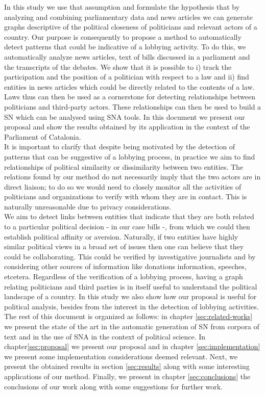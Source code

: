 In this study we use that assumption and formulate the hypothesis that by analyzing and combining parliamentary data and news articles we can generate graphs descriptive of the political closeness of politicians and relevant actors of a country. Our purpose is consequently to propose a method to automatically detect patterns that could be indicative of a lobbying activity. To do this, we automatically analyze news articles, text of bills discussed in a parliament and the transcripts of the debates. We show that it is possible to i) track the participation and the position of a politician with respect to a law and ii) find entities in news articles which could be directly related to the contents of a law. Laws thus can then be used as a cornerstone for detecting relationships between politicians and third-party actors. These relationships can then be used to build a SN which can be analysed using SNA tools. In this document we present our proposal and show the results obtained by its application in the context of the Parliament of Catalonia. \\

It is important to clarify that despite being motivated by the detection of patterns that can be suggestive of a lobbying process, in practice we aim to find relationships of political similarity or dissimilarity between two entities. The relations found by our method do not necessarily imply that the two actors are in direct liaison;  to do so we would need to closely monitor all the activities of politicians and organizations to verify with whom they are in contact. This is naturally unreasonable due to privacy considerations. \\

We aim to detect links between entities that indicate that they are both related to a particular political decision - in our case bills -, from which we could then establish political affinity or aversion. Naturally, if two entities have highly similar political views in a broad set of issues then one can believe that they could be collaborating. This could be verified by investigative journalists and by considering other sources of information like donations information, speeches, etcetera. Regardless of the verification of a lobbying process, having a graph relating politicians and third parties is in itself useful to understand the political landscape of a country. In this study we also show how our proposal is useful for political analysis, besides from the interest in the detection of lobbying activities. \\

The rest of this document is organized as follows: in chapter \ref{sec:related-works} we present the state of the art in the automatic generation of SN from corpora of text and in the use of SNA in the context of political science. In chapter\ref{sec:proposal} we present our proposal and in chapter \ref{sec:implementation} we present some implementation considerations deemed relevant. Next, we present the obtained results in section \ref{sec:results} along with some interesting applications of our method. Finally, we present in chapter \ref{sec:conclusions} the conclusions of our work along with some suggestions for further work.

